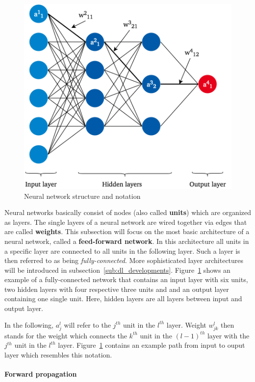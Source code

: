 \begin{figure}[h]
  \centering
  \includegraphics[height=10cm]{img/nn_architecture_2}
  \caption{Neural network structure and notation}
\label{fig:nn_architecture}
\end{figure}

Neural networks basically consist of nodes (also called \textbf{units}) which
are organized as layers.
The single layers of a neural network are wired together via edges that are
called \textbf{weights}.
This subsection will focus on the most basic architecture of a neural network,
called a \textbf{feed-forward network}.
In this architecture all units in a specific layer are connected to all units
in the following layer.
Such a layer is then referred to as being \textit{fully-connected}.
More sophisticated layer architectures will be introduced in subsection~\ref{sub:dl_developments}.
Figure~\ref{fig:nn_architecture} shows an example of a fully-connected network
that contains an input layer with six units, two hidden layers with four respective
three units and and an output layer containing one single unit.
Here, hidden layers are all layers between input and output layer.

In the following, $a_j^l$ will refer to the $j^{th}$ unit in the $l^{th}$ layer.
Weight $w_{jk}^l$ then stands for the weight which connects the $k^{th}$ unit in
the ${(l-1)}^{th}$ layer with the $j^{th}$ unit in the $l^{th}$ layer.
Figure~\ref{fig:nn_architecture} contains an example path from input to ouput
layer which resembles this notation.

\paragraph{Forward propagation}
\label{sub:dl_forward}

